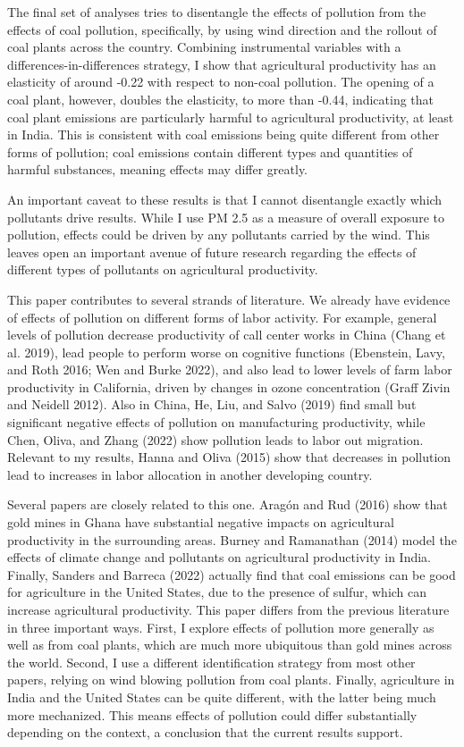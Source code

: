 \documentclass[
]{article}
\begin{document}
The final set of analyses tries to disentangle the effects of pollution from the effects of coal pollution, specifically, by using wind direction and the rollout of coal plants across the country. Combining instrumental variables with a differences-in-differences strategy, I show that agricultural productivity has an elasticity of around -0.22 with respect to non-coal pollution. The opening of a coal plant, however, doubles the elasticity, to more than -0.44, indicating that coal plant emissions are particularly harmful to agricultural productivity, at least in India. This is consistent with coal emissions being quite different from other forms of pollution; coal emissions contain different types and quantities of harmful substances, meaning effects may differ greatly.

An important caveat to these results is that I cannot disentangle exactly which pollutants drive results. While I use PM 2.5 as a measure of overall exposure to pollution, effects could be driven by any pollutants carried by the wind. This leaves open an important avenue of future research regarding the effects of different types of pollutants on agricultural productivity.

This paper contributes to several strands of literature. We already have evidence of effects of pollution on different forms of labor activity. For example, general levels of pollution decrease productivity of call center works in China (Chang et al. 2019), lead people to perform worse on cognitive functions (Ebenstein, Lavy, and Roth 2016; Wen and Burke 2022), and also lead to lower levels of farm labor productivity in California, driven by changes in ozone concentration (Graff Zivin and Neidell 2012). Also in China, He, Liu, and Salvo (2019) find small but significant negative effects of pollution on manufacturing productivity, while Chen, Oliva, and Zhang (2022) show pollution leads to labor out migration. Relevant to my results, Hanna and Oliva (2015) show that decreases in pollution lead to increases in labor allocation in another developing country.

Several papers are closely related to this one. Aragón and Rud (2016) show that gold mines in Ghana have substantial negative impacts on agricultural productivity in the surrounding areas. Burney and Ramanathan (2014) model the effects of climate change and pollutants on agricultural productivity in India. Finally, Sanders and Barreca (2022) actually find that coal emissions can be good for agriculture in the United States, due to the presence of sulfur, which can increase agricultural productivity. This paper differs from the previous literature in three important ways. First, I explore effects of pollution more generally as well as from coal plants, which are much more ubiquitous than gold mines across the world. Second, I use a different identification strategy from most other papers, relying on wind blowing pollution from coal plants. Finally, agriculture in India and the United States can be quite different, with the latter being much more mechanized. This means effects of pollution could differ substantially depending on the context, a conclusion that the current results support.
\end{document}
